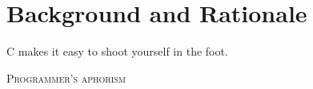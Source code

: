 %
%
\chapter{Background and Rationale}\label{ch:relatedwork}


\epigraph{ C makes it easy to shoot yourself in the foot. }%
         { \textsc{Programmer's aphorism} }


